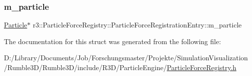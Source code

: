 \subsubsection{\texorpdfstring{m\+\_\+particle}{m\_particle}}
{\footnotesize\ttfamily \mbox{\hyperlink{classr3_1_1_particle}{Particle}}$\ast$ r3\+::\+Particle\+Force\+Registry\+::\+Particle\+Force\+Registration\+Entry\+::m\+\_\+particle}



The documentation for this struct was generated from the following file\+:\begin{DoxyCompactItemize}
\item 
D\+:/\+Library/\+Documents/\+Job/\+Forschungsmaster/\+Projekte/\+Simulation\+Visualization/\+Rumble3\+D/\+Rumble3\+D/include/\+R3\+D/\+Particle\+Engine/\mbox{\hyperlink{_particle_force_registry_8h}{Particle\+Force\+Registry.\+h}}\end{DoxyCompactItemize}
